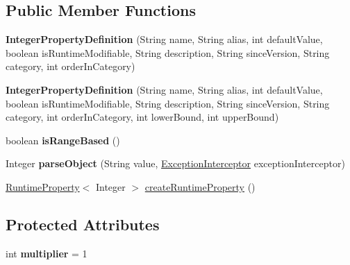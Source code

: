 \subsection*{Public Member Functions}
\begin{DoxyCompactItemize}
\item 
\mbox{\label{classcom_1_1mysql_1_1cj_1_1conf_1_1_integer_property_definition_a5633ed14140d3ee4f23a8b0fe9a2f378}} 
{\bfseries Integer\+Property\+Definition} (String name, String alias, int default\+Value, boolean is\+Runtime\+Modifiable, String description, String since\+Version, String category, int order\+In\+Category)
\item 
\mbox{\label{classcom_1_1mysql_1_1cj_1_1conf_1_1_integer_property_definition_abbc937397a11c912ca0a26f180b61df9}} 
{\bfseries Integer\+Property\+Definition} (String name, String alias, int default\+Value, boolean is\+Runtime\+Modifiable, String description, String since\+Version, String category, int order\+In\+Category, int lower\+Bound, int upper\+Bound)
\item 
\mbox{\label{classcom_1_1mysql_1_1cj_1_1conf_1_1_integer_property_definition_ada0b35723ac1fe8089ecbbf357d30b1a}} 
boolean {\bfseries is\+Range\+Based} ()
\item 
\mbox{\label{classcom_1_1mysql_1_1cj_1_1conf_1_1_integer_property_definition_a03819bef8deb0e4f6072d7ee1f9028d5}} 
Integer {\bfseries parse\+Object} (String value, \mbox{\hyperlink{interfacecom_1_1mysql_1_1cj_1_1exceptions_1_1_exception_interceptor}{Exception\+Interceptor}} exception\+Interceptor)
\item 
\mbox{\hyperlink{interfacecom_1_1mysql_1_1cj_1_1conf_1_1_runtime_property}{Runtime\+Property}}$<$ Integer $>$ \mbox{\hyperlink{classcom_1_1mysql_1_1cj_1_1conf_1_1_integer_property_definition_a446876e16f36d1c1731cfdf5174b7942}{create\+Runtime\+Property}} ()
\end{DoxyCompactItemize}
\subsection*{Protected Attributes}
\begin{DoxyCompactItemize}
\item 
\mbox{\label{classcom_1_1mysql_1_1cj_1_1conf_1_1_integer_property_definition_ac826198fbf31637b836b1fa754ddfb1c}} 
int {\bfseries multiplier} = 1
\end{DoxyCompactItemize}


